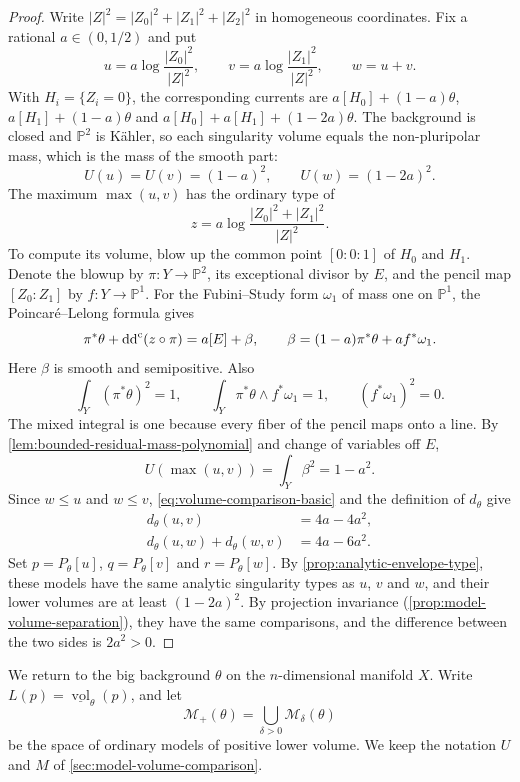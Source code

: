 \begin{proof}
Write $|Z|^2=|Z_0|^2+|Z_1|^2+|Z_2|^2$ in homogeneous coordinates. Fix a rational $a\in(0,1/2)$ and put
\[
 u=a\log\frac{|Z_0|^2}{|Z|^2},\qquad
 v=a\log\frac{|Z_1|^2}{|Z|^2},\qquad w=u+v.
\]
With $H_i=\{Z_i=0\}$, the corresponding currents are $a[H_0]+(1-a)\theta$, $a[H_1]+(1-a)\theta$ and $a[H_0]+a[H_1]+(1-2a)\theta$. The background is closed and $\mathbb P^2$ is K\"ahler, so each singularity volume equals the non-pluripolar mass, which is the mass of the smooth part:
\[
 U(u)=U(v)=(1-a)^2,\qquad U(w)=(1-2a)^2.
\]
The maximum $\max(u,v)$ has the ordinary type of
\[
 z=a\log\frac{|Z_0|^2+|Z_1|^2}{|Z|^2}.
\]
To compute its volume, blow up the common point $[0:0:1]$ of $H_0$ and $H_1$. Denote the blowup by $\pi\colon Y\to\mathbb P^2$, its exceptional divisor by $E$, and the pencil map $[Z_0:Z_1]$ by $f\colon Y\to\mathbb P^1$. For the Fubini--Study form $\omega_1$ of mass one on $\mathbb P^1$, the Poincar\'e--Lelong formula gives
\[
 \pi^*\theta+\mathrm{dd}^{\mathrm{c}}(z\circ\pi)=a[E]+\beta,
 \qquad \beta=(1-a)\pi^*\theta+af^*\omega_1.
\]
Here $\beta$ is smooth and semipositive. Also
\[
 \int_Y(\pi^*\theta)^2=1,\qquad
 \int_Y\pi^*\theta\wedge f^*\omega_1=1,\qquad
 (f^*\omega_1)^2=0.
\]
The mixed integral is one because every fiber of the pencil maps onto a line. By \cref{lem:bounded-residual-mass-polynomial} and change of variables off $E$,
\[
 U(\max(u,v))=\int_Y\beta^2=1-a^2.
\]
Since $w\leq u$ and $w\leq v$, \eqref{eq:volume-comparison-basic} and the definition of $d_\theta$ give
\[
 \begin{split}
 d_\theta(u,v)&=4a-4a^2,\\
 d_\theta(u,w)+d_\theta(w,v)&=4a-6a^2.
 \end{split}
\]
Set $p=P_\theta[u]$, $q=P_\theta[v]$ and $r=P_\theta[w]$. By \cref{prop:analytic-envelope-type}, these models have the same analytic singularity types as $u$, $v$ and $w$, and their lower volumes are at least $(1-2a)^2$. By projection invariance (\cref{prop:model-volume-separation}), they have the same comparisons, and the difference between the two sides is $2a^2>0$.
\end{proof}

We return to the big background $\theta$ on the $n$-dimensional manifold $X$. Write $L(p)=\underline{\operatorname{vol}}_\theta(p)$, and let
\[
 \mathcal M_+(\theta)=\bigcup_{\delta>0}\mathcal M_\delta(\theta)
\]
be the space of ordinary models of positive lower volume. We keep the notation $U$ and $M$ of \cref{sec:model-volume-comparison}.

